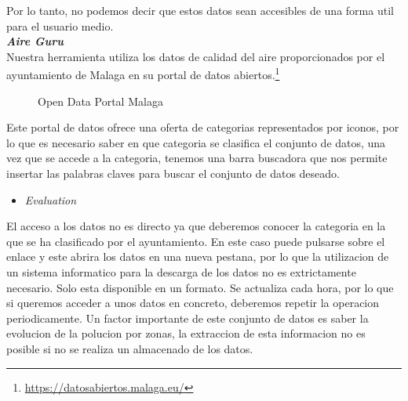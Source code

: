 Por lo tanto, no podemos decir que estos datos sean accesibles de una forma util para el usuario medio.\\
 
\noindent\textbf{\textit{Aire Guru} }\\

Nuestra herramienta utiliza los datos de calidad del aire proporcionados por el ayuntamiento de Malaga en su portal de datos abiertos.\footnote{\url{https://datosabiertos.malaga.eu/}}\\
\begin{figure}[h]
    \centering
    \hfill
  
  \caption{Open Data Portal Malaga}
    \end{figure}

    Este portal de datos ofrece una oferta de categorias representados por iconos, por lo que es necesario saber en que categoria se clasifica el conjunto
de datos, una vez que se accede a la categoria, tenemos una barra buscadora que nos permite insertar las palabras claves para buscar el conjunto de datos
deseado.\\
\begin{itemize}
    \item \textit{Evaluation}
\end{itemize}
El acceso a los datos no es directo ya que deberemos conocer la categoria en la que se ha clasificado por el ayuntamiento.
En este caso puede pulsarse sobre el enlace y este abrira los datos en una nueva pestana, por lo que la utilizacion de un sistema informatico
para la descarga de los datos no es extrictamente necesario.
Solo esta disponible en un formato.
Se actualiza cada hora, por lo que si queremos acceder a unos datos en concreto, deberemos repetir la operacion periodicamente.
Un factor importante de este conjunto de datos es saber la evolucion de la polucion por zonas, la extraccion de esta informacion no es posible
si no se realiza un almacenado de los datos.
